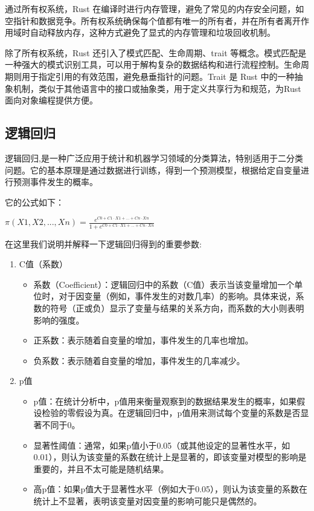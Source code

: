 通过所有权系统，Rust 在编译时进行内存管理，避免了常见的内存安全问题，如空指针和数据竞争。所有权系统确保每个值都有唯一的所有者，并在所有者离开作用域时自动释放内存，这种方式避免了显式的内存管理和垃圾回收机制。

除了所有权系统，Rust 还引入了模式匹配、生命周期、trait 等概念。模式匹配是一种强大的模式识别工具，可以用于解构复杂的数据结构和进行流程控制。生命周期则用于指定引用的有效范围，避免悬垂指针的问题。Trait 是 Rust 中的一种抽象机制，类似于其他语言中的接口或抽象类，用于定义共享行为和规范，为Rust面向对象编程提供方便。

\subsection{逻辑回归}
逻辑回归\cite{kleinbaum2002logistic,stoltzfus2011logistic,lavalley2008logistic,sperandei2014understanding},是一种广泛应用于统计和机器学习领域的分类算法，特别适用于二分类问题。它的基本原理是通过数据进行训练，得到一个预测模型，根据给定自变量进行预测事件发生的概率。

它的公式如下：

$π(X1, X2, ..., Xn) = \frac{e^{C0+C1·X1+...+Cn·Xn}} { 1 + e^{C0+C1·X1+...+Cn·Xn}}$

在这里我们说明并解释一下逻辑回归得到的重要参数:
\begin{enumerate}
  \item C值（系数）
      \begin{itemize}
          \item 系数（Coefficient）：逻辑回归中的系数（C值）表示当该变量增加一个单位时，对于因变量（例如，事件发生的对数几率）的影响。具体来说，系数的符号（正或负）显示了变量与结果的关系方向，而系数的大小则表明影响的强度。
          \item 正系数：表示随着自变量的增加，事件发生的几率也增加。
          \item 负系数：表示随着自变量的增加，事件发生的几率减少。
      \end{itemize}
  \item p值\cite{andrade2019p}
      \begin{itemize}
          \item  p值：在统计分析中，p值用来衡量观察到的数据结果发生的概率，如果假设检验的零假设为真。在逻辑回归中，p值用来测试每个变量的系数是否显著不同于0。
          \item 显著性阈值：通常，如果p值小于0.05（或其他设定的显著性水平，如0.01），则认为该变量的系数在统计上是显著的，即该变量对模型的影响是重要的，并且不太可能是随机结果。
          \item 高p值：如果p值大于显著性水平（例如大于0.05），则认为该变量的系数在统计上不显著，表明该变量对因变量的影响可能只是偶然的。
      \end{itemize}
\end{enumerate}
  
